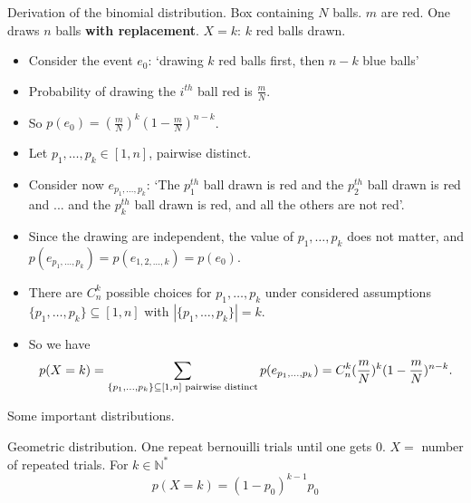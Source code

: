 \documentclass{beamer}
\begin{document}
\begin{frame}{Derivation of the binomial distribution.}
  Box containing $N$ balls. $m$ are red. One draws $n$ balls \textbf{with replacement}. $X = k$: $k$ red balls drawn.
  
  \begin{itemize}
  \item Consider the event $e_0$: `drawing $k$ red balls first, then $n-k$ blue balls'
  \item Probability of drawing the $i^{th}$ ball red is $\frac{m}{N}$.
  \item So $p(e_0) = (\frac{m}{N})^k(1-\frac{m}{N})^{n-k}$.
  \item Let $p_1, \dots, p_k \in [1,n]$, pairwise distinct.
  \item Consider now $e_{p_1, \dots, p_k}$: `The $p_1^{th}$ ball drawn is red and the $p_2^{th}$ ball drawn is red and ... and the $p_k^{th}$ ball drawn is red, and all the others are not red'.
  \item Since the drawing are independent, the value of $p_1, \dots, p_k$ does not matter, and $p(e_{p_1, \dots, p_k}) = p(e_{1, 2, \dots, k}) = p(e_0)$.
  \item There are $C^k_n$ possible choices for $p_1, \dots, p_k$ under considered assumptions $\{p_1, \dots, p_k\} \subseteq [1,n]$ with $|\{p_1, \dots, p_k\}| = k$.
  \item So we have \[p(X = k) = \sum_{\{p_1, \dots, p_k\} \subseteq [1,n] \textnormal{ pairwise distinct} } p(e_{p_1, \dots, p_k}) =  C^k_n (\frac{m}{N})^k(1-\frac{m}{N})^{n-k}.\]
  \end{itemize}
  
\end{frame}



\begin{frame}{Some important distributions.}
  \begin{exampleblock}{Geometric distribution.}
    One repeat bernouilli trials until one gets $0$. $X = $ number of repeated trials. For $k \in \mathbb{N}^*$
    \[p(X = k) = (1 - p_0)^{k-1}p_0\]
    
  \end{exampleblock}
\end{frame}
\end{document}
